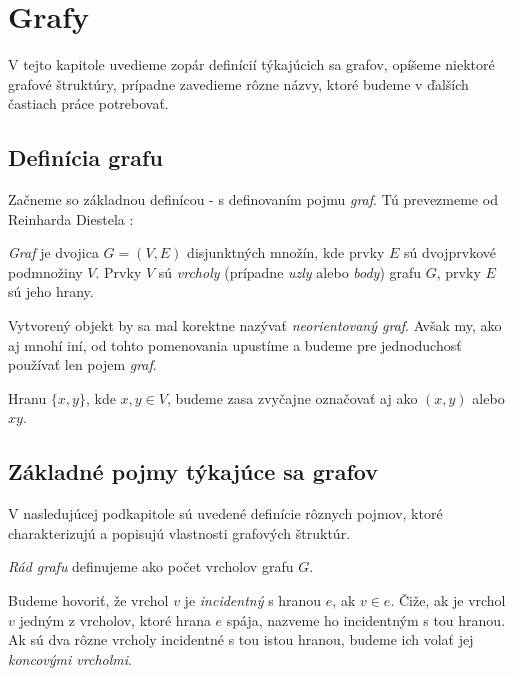 \chapter{Grafy}
\label{kap:grafy}

V tejto kapitole uvedieme zopár definícií týkajúcich sa grafov, opíšeme niektoré grafové štruktúry, prípadne zavedieme rôzne názvy, ktoré budeme v ďalších častiach práce potrebovať.


\section{Definícia grafu}

Začneme so základnou definícou - s definovaním pojmu \textit{graf}. Tú prevezmeme od Reinharda Diestela \cite[kapitola 0.1]{Diestel2000}: \newline

\textit{Graf} je dvojica $G = (V, E)$ disjunktných množín, kde prvky $E$ sú dvojprvkové podmnožiny $V$. Prvky $V$ sú \textit{vrcholy} (prípadne \textit{uzly} alebo \textit{body}) grafu $G$, prvky $E$ sú jeho hrany. \newline

Vytvorený objekt by sa mal korektne nazývať \textit{neorientovaný graf}. Avšak my, ako aj mnohí iní, od tohto pomenovania upustíme a budeme pre jednoduchosť používať len pojem \textit{graf}.\newline

Hranu $\{x, y\}$, kde $x,y\in V$, budeme zasa zvyčajne označovať aj ako $(x, y)$ alebo $xy$.


\section{Základné pojmy týkajúce sa grafov}

V nasledujúcej podkapitole sú uvedené definície rôznych pojmov, ktoré charakterizujú a popisujú vlastnosti grafových štruktúr.\newline

\textit{Rád grafu} definujeme ako počet vrcholov grafu $G$.\newline

Budeme hovoriť, že vrchol $v$ je \textit{incidentný} s hranou $e$, ak $v \in e$. Čiže, ak je vrchol $v$ jedným z vrcholov, ktoré hrana $e$ spája, nazveme ho incidentným s tou hranou. Ak sú dva rôzne vrcholy incidentné s tou istou hranou, budeme ich volať jej \textit{koncovými vrcholmi}.\newline

